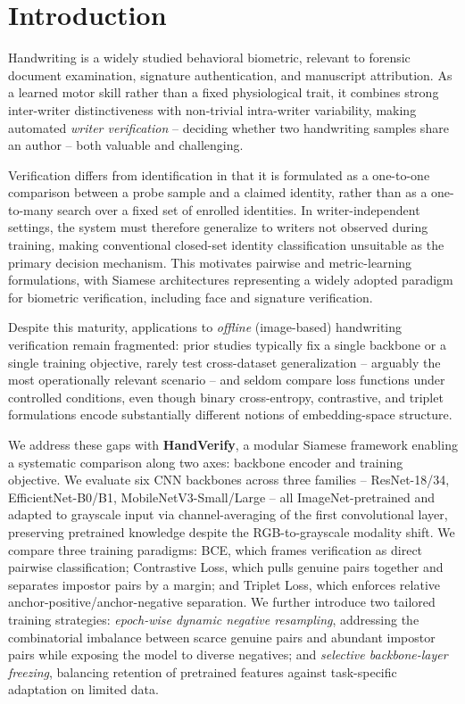 \section{Introduction}\label{sec:introduction}

Handwriting is a widely studied behavioral biometric, relevant to forensic document examination, signature authentication, and manuscript attribution. As a learned motor skill rather than a fixed physiological trait, it combines strong inter-writer distinctiveness with non-trivial intra-writer variability, making automated \emph{writer verification} -- deciding whether two handwriting samples share an author -- both valuable and challenging.

Verification differs from identification in that it is formulated as a one-to-one comparison between a probe sample and a claimed identity, rather than as a one-to-many search over a fixed set of enrolled identities. In writer-independent settings, the system must therefore generalize to writers not observed during training, making conventional closed-set identity classification unsuitable as the primary decision mechanism. This motivates pairwise and metric-learning formulations, with Siamese\cite{koch2015siamese} architectures representing a widely adopted paradigm for biometric verification, including face and signature verification.

Despite this maturity, applications to \emph{offline} (image-based) handwriting verification remain fragmented: prior studies typically fix a single backbone or a single training objective, rarely test cross-dataset generalization -- arguably the most operationally relevant scenario -- and seldom compare loss functions under controlled conditions, even though binary cross-entropy, contrastive, and triplet formulations encode substantially different notions of embedding-space structure.

We address these gaps with \textbf{HandVerify}, a modular Siamese framework enabling a systematic comparison along two axes: backbone encoder and training objective. We evaluate six CNN backbones across three families -- ResNet\cite{he2016resnet}-18/34, EfficientNet\cite{tan2019efficientnet}-B0/B1, MobileNetV3\cite{howard2019mobilenetv3}-Small/Large -- all ImageNet\cite{deng2009imagenet}-pretrained and adapted to grayscale input via channel-averaging of the first convolutional layer, preserving pretrained knowledge despite the RGB-to-grayscale modality shift. We compare three training paradigms: BCE, which frames verification as direct pairwise classification; Contrastive Loss\cite{hadsell2006contrastive}, which pulls genuine pairs together and separates impostor pairs by a margin; and Triplet Loss\cite{schroff2015facenet}, which enforces relative anchor-positive/anchor-negative separation. We further introduce two tailored training strategies: \emph{epoch-wise dynamic negative resampling}, addressing the combinatorial imbalance between scarce genuine pairs and abundant impostor pairs while exposing the model to diverse negatives; and \emph{selective backbone-layer freezing}, balancing retention of pretrained features against task-specific adaptation on limited data.

